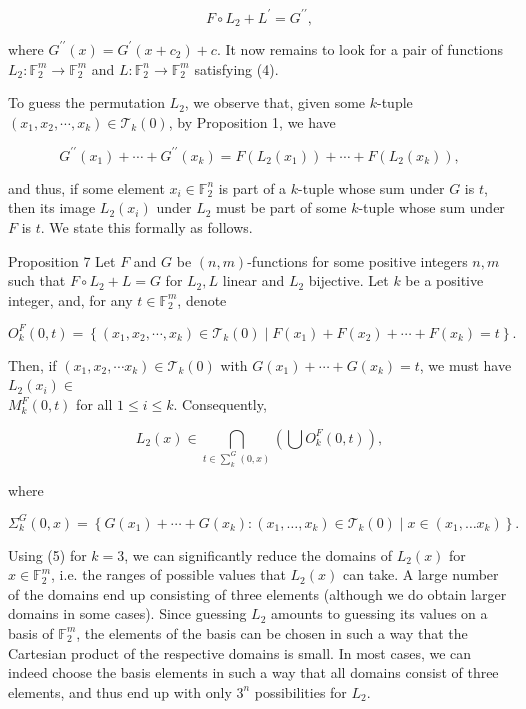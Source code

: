 \documentclass[10pt]{article}
\begin{document}
\begin{equation*}
F \circ L_{2}+L^{\prime}=G^{\prime \prime}, \tag{4}
\end{equation*}


where $G^{\prime \prime}(x)=G^{\prime}\left(x+c_{2}\right)+c$. It now remains to look for a pair of functions $L_{2}: \mathbb{F}_{2}^{m} \rightarrow \mathbb{F}_{2}^{m}$ and $L: \mathbb{F}_{2}^{n} \rightarrow \mathbb{F}_{2}^{m}$ satisfying (4).

To guess the permutation $L_{2}$, we observe that, given some $k$-tuple $\left(x_{1}, x_{2}, \cdots, x_{k}\right) \in \mathcal{T}_{k}(0)$, by Proposition 1, we have

$$
G^{\prime \prime}\left(x_{1}\right)+\cdots+G^{\prime \prime}\left(x_{k}\right)=F\left(L_{2}\left(x_{1}\right)\right)+\cdots+F\left(L_{2}\left(x_{k}\right)\right),
$$

and thus, if some element $x_{i} \in \mathbb{F}_{2}^{n}$ is part of a $k$-tuple whose sum under $G$ is $t$, then its image $L_{2}\left(x_{i}\right)$ under $L_{2}$ must be part of some $k$-tuple whose sum under $F$ is $t$. We state this formally as follows.

Proposition 7 Let $F$ and $G$ be $(n, m)$-functions for some positive integers $n, m$ such that $F \circ L_{2}+L=G$ for $L_{2}, L$ linear and $L_{2}$ bijective. Let $k$ be a positive integer, and, for any $t \in \mathbb{F}_{2}^{m}$, denote

$$
O_{k}^{F}(0, t)=\left\{\left(x_{1}, x_{2}, \cdots, x_{k}\right) \in \mathcal{T}_{k}(0) \mid F\left(x_{1}\right)+F\left(x_{2}\right)+\cdots+F\left(x_{k}\right)=t\right\} .
$$

Then, if $\left(x_{1}, x_{2}, \cdots x_{k}\right) \in \mathcal{T}_{k}(0)$ with $G\left(x_{1}\right)+\cdots+G\left(x_{k}\right)=t$, we must have $L_{2}\left(x_{i}\right) \in$\\
$M_{k}^{F}(0, t)$ for all $1 \leq i \leq k$. Consequently,


\begin{equation*}
L_{2}(x) \in \bigcap_{t \in \sum_{k}^{G}(0, x)}\left(\bigcup O_{k}^{F}(0, t)\right), \tag{5}
\end{equation*}


where

$$
\Sigma_{k}^{G}(0, x)=\left\{G\left(x_{1}\right)+\cdots+G\left(x_{k}\right):\left(x_{1}, \ldots, x_{k}\right) \in \mathcal{T}_{k}(0) \mid x \in\left(x_{1}, \ldots x_{k}\right)\right\} .
$$

Using (5) for $k=3$, we can significantly reduce the domains of $L_{2}(x)$ for $x \in \mathbb{F}_{2}^{m}$, i.e. the ranges of possible values that $L_{2}(x)$ can take. A large number of the domains end up consisting of three elements (although we do obtain larger domains in some cases). Since guessing $L_{2}$ amounts to guessing its values on a basis of $\mathbb{F}_{2}^{m}$, the elements of the basis can be chosen in such a way that the Cartesian product of the respective domains is small. In most cases, we can indeed choose the basis elements in such a way that all domains consist of three elements, and thus end up with only $3^{n}$ possibilities for $L_{2}$.
\end{document}
